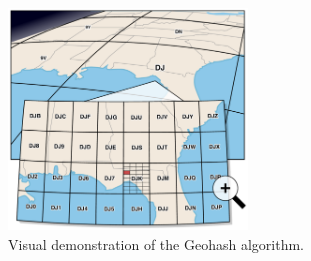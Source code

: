 \begin{figure}[h!]
    \centerline{\includegraphics[width=2.5in]{figures/geohash.pdf}}
    \caption{Visual demonstration of the Geohash algorithm.}
    \label{fig:geohash}
\end{figure}


